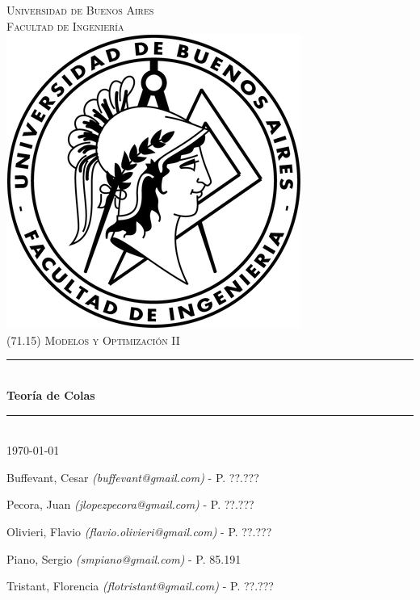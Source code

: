 \documentclass[a4paper,11pt]{article}
\begin{document}
\thispagestyle{empty}

\begin{titlepage}

\newcommand{\HRule}{\rule{\linewidth}{0.5mm}}
\newenvironment{bottompar}{\par\vspace*{\fill}}{\clearpage}

\center

\textsc{\LARGE Universidad de Buenos Aires}\\[0.5cm]
\textsc{\Large Facultad de Ingeniería}\\[1.5cm]

\includegraphics[scale=0.5]{../logo.png}\\[1cm]


\textsc{\large (71.15) Modelos y Optimización II}\\[0.25cm]
\HRule \\[0.4cm]
{\huge \bfseries Teoría de Colas}\\[0.4cm]
\HRule \\[0.5cm]

{\large \today}

\begin{bottompar}
\flushleft
Buffevant, Cesar \textit{(buffevant@gmail.com)}         - P. ??.???

Pecora, Juan \textit{(jlopezpecora@gmail.com)}          - P. ??.???

Olivieri, Flavio \textit{(flavio.olivieri@gmail.com)}   - P. ??.???

Piano, Sergio \textit{(smpiano@gmail.com)}              - P. 85.191

Tristant, Florencia \textit{(flotristant@gmail.com)}    - P. ??.???
\end{bottompar}

\end{titlepage}
\end{document}
